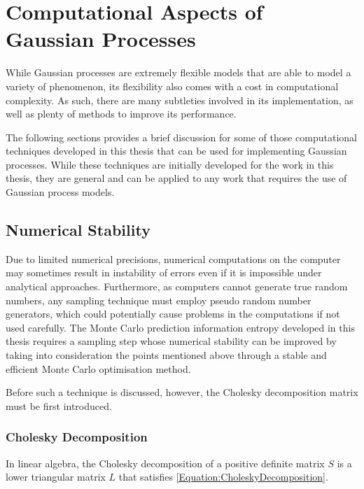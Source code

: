 \chapter{Computational Aspects of Gaussian Processes}
\label{Appendix:ComputationalAspects}

	While Gaussian processes are extremely flexible models that are able to model a variety of phenomenon, its flexibility also comes with a cost in computational complexity. As such, there are many subtleties involved in its implementation, as well as plenty of methods to improve its performance.
	
	The following sections provides a brief discussion for some of those computational techniques developed in this thesis that can be used for implementing Gaussian processes. While these techniques are initially developed for the work in this thesis, they are general and can be applied to any work that requires the use of Gaussian process models. 
	
	\section{Numerical Stability}
	\label{Appendix:ComputationalAspects:NumericalStability}
	
		Due to limited numerical precisions, numerical computations on the computer may sometimes result in instability of errors even if it is impossible under analytical approaches. Furthermore, as computers cannot generate true random numbers, any sampling technique must employ pseudo random number generators, which could potentially cause problems in the computations if not used carefully. The Monte Carlo prediction information entropy  developed in this thesis requires a sampling step whose numerical stability can be improved by taking into consideration the points mentioned above through a stable and efficient Monte Carlo optimisation method.
		
		Before such a technique is discussed, however, the Cholesky decomposition matrix must be first introduced.
		
		\subsection{Cholesky Decomposition}
		\label{Appendix:ComputationalAspects:NumericalStability:Cholesky}
			
			In linear algebra, the Cholesky decomposition of a positive definite matrix $S$ is a lower triangular matrix $L$ that satisfies \eqref{Equation:CholeskyDecomposition}.
			
